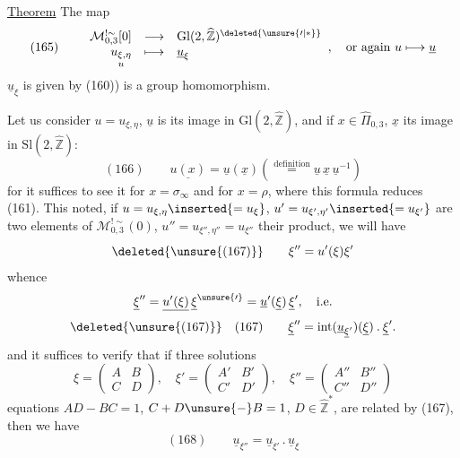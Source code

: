 \uline{Theorem} The map
\[
(165)\qquad
\begin{array}{rcl}
\mathcal M_{0,3}^{!\sim}[0]&\longrightarrow&
\mathrm{Gl}(2,\widehat{\mathbb Z})^{\deleted{\unsure{\prime|*}}}\\
\underset{u}{u_{\xi,\eta}}&\longmapsto&\underline u_\xi
\end{array},
\quad\text{or again }u\longmapsto\underline u
\]
$\underline u_\xi$ is given by (160)) is a group homomorphism.



Let us consider $u=u_{\xi,\eta}$,
$\underline u$ is its image in $\mathrm{Gl}(2,\widehat{\mathbb Z})$,
and if $x\in\widehat\Pi_{0,3}$, $\underline x$
its image in $\mathrm{Sl}(2,\widehat{\mathbb Z})$:
\[
(166)\qquad
\underline{u(x)}=\underline u(\underline x)
\left(\stackrel{\text{definition}}{=}
\underline u\,\underline x\,\underline u^{-1}\right)
\]
for it suffices to see it for $x=\sigma_\infty$ and for $x=\rho$,
where this formula reduces  (161). This noted,
if $u=u_{\xi,\eta}\inserted{=u_\xi}$,
$u'=u_{\xi',\eta'}\inserted{=u_{\xi'}}$
are two elements of $\mathcal M_{0,3}^{!\sim}(0)$,
$u''=u_{\xi'',\eta''}=u_{\xi''}$ their product, we will have
\[
\deleted{\unsure{(167)}}\qquad\xi''=u'(\xi)\xi'
\]
whence
\[
\underline\xi''=\underline{u'(\xi)}\,\underline\xi^{\unsure{\prime}}
=\underline u'(\underline\xi)\,\underline\xi',\quad\text{i.e.}
\]
\[
\deleted{\unsure{(167)}}\quad(167)\qquad
\underline\xi''=\operatorname{int}
(\underline u_{\underline\xi'})(\underline\xi)\mathbin{.}\underline\xi'.
\]
and it suffices to verify that if three solutions
\[
\xi=\begin{pmatrix}A&B\\C&D\end{pmatrix},
\quad\xi'=\begin{pmatrix}A'&B'\\C'&D'\end{pmatrix},
\quad\xi''=\begin{pmatrix}A''&B''\\C''&D''\end{pmatrix}
\]
 equations
$AD-BC=1$, $C+D\unsure{-}B=1$, $D\in\widehat{\mathbb Z}^{*}$,
are related by (167), then we have
\[
(168)\qquad
\underline u_{\xi''}=\underline u_{\xi'}\mathbin{.}\underline u_\xi
\]


